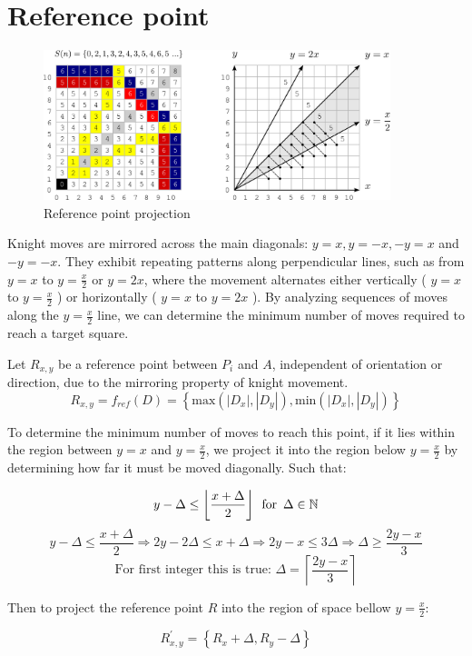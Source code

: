 \documentclass[a4paper, 12pt]{article}
\begin{document}
\section{Reference point}
\begin{figure}[H]
  \centering
  \includegraphics[width=0.9\textwidth]{figures/figure-2.png}
  \caption{Reference point projection}
\end{figure}
Knight moves are mirrored across the main diagonals: \( y = x, y = -x, -y = x \) and \( -y = -x \). They exhibit 
repeating patterns along perpendicular lines, such as from \( y = x \) to \( y = \frac{x}{2} \) or \( y = 2x \), 
where the movement alternates either vertically ( \( y = x \) to \( y = \frac{x}{2} \) ) or horizontally ( \( y = x \) 
to \( y = 2x \) ). By analyzing sequences of moves along the \( y = \frac{x}{2} \) line,  we can determine the 
minimum number of moves required to reach a target square.

\vspace{1em}
\noindent Let \( R_{x,y} \) be a reference point between \( P_i \) and \( A \), independent of orientation or 
direction, due to the mirroring property of knight movement.
\[ 
R_{x,y} = f_{ref}(D) = \left\{ \text{max}(|D_x|,|D_y|), \text{min}(|D_x|,|D_y|) \right\} 
\]

\noindent To determine the minimum number of moves to reach this point, if it lies within the region between
\( y = x \) and \( y = \frac{x}{2} \), we project it into the region below \( y = \frac{x}{2} \) by determining how far 
it must be moved diagonally. Such that:

\vspace{0.5em}
\[
y - \Delta \le \left\lfloor \dfrac{x+\Delta}{2} \right\rfloor \hspace{0.5em} \text{for} \hspace{0.5em} \Delta \in \mathbb{N}
\]
\vspace{0.5em}
\[
y - \Delta \le \dfrac{x + \Delta}{2} \Rightarrow
2y - 2\Delta \le x + \Delta \Rightarrow
2y - x \le 3\Delta \Rightarrow
\Delta \ge \dfrac{2y - x}{3}
\]
\vspace{0.5em}
\[
\text{For first integer this is true: } \Delta = \left\lceil \dfrac{2y-x}{3}\right\rceil
\]
\begin{center}
Then to project the reference point \( R \) into the region of space bellow \( y=\frac{x}{2} \):
\end{center}
\[
R^{'}_{x,y} = \left\{ R_x + \Delta , R_y - \Delta \right\}
\]
\newpage
\end{document}
